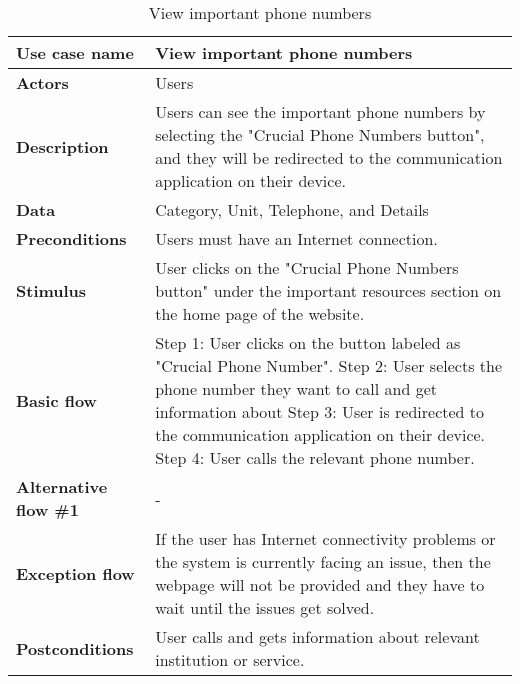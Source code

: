 \documentclass[listof=nochaptergap]{report}
\begin{document}
    \begin{table}[H]
        \centering
         \begin{tabular}{| p{4cm} | p{10cm} |} 
         \hline
         \textbf{Use case name} & View important phone numbers \\
         \hline
         \textbf{Actors} & Users \\
         \hline
         \textbf{Description} & Users can see the important phone numbers by selecting the "Crucial Phone Numbers button", and they will be redirected to the communication application on their device. \\
         \hline
         \textbf{Data} & Category, Unit, Telephone, and Details \\
         \hline
         \textbf{Preconditions} & Users must have an Internet connection. \\
         \hline
         \textbf{Stimulus} & User clicks on the "Crucial Phone Numbers button" under the important resources section on the home page of the website. \\
         \hline
         \textbf{Basic flow} & Step 1: User clicks on the button labeled as "Crucial Phone Number". \newline Step 2: User selects the phone number they want to call and get information about \newline Step 3: User is redirected to the communication application on their device.  \newline Step 4: User calls the relevant phone number. \\
         \hline
         \textbf{Alternative flow \#1} & - \\
         \hline
         \textbf{Exception flow} & If the user has Internet connectivity problems or the system is currently facing an issue, then the webpage will not be provided and they have to wait until the issues get solved. \\
         \hline
         \textbf{Postconditions} & User calls and gets information about relevant institution or service. \\
         \hline
         \end{tabular}
        \caption{View important phone numbers}
        \label{tab:table2}
    \end{table}
\end{document}
